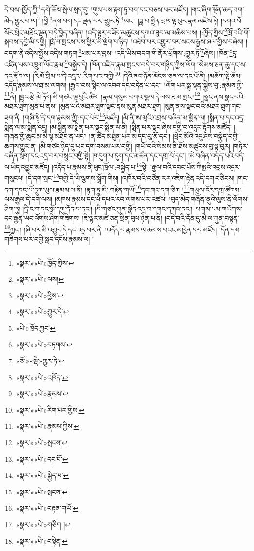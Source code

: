 དེ་བས་:ཁྱོད་ཀྱི་\footnote{«སྣར་»«པེ་»ཁྱོད་ཀྱིས་}དགེ་ཆོས་སྤེལ་སླད་དུ། །གུས་པས་རྟག་ཏུ་བག་དང་བཅས་པར་མཛོད། །གང་ཞིག་སྔོན་ཆད་བག་མེད་གྱུར་པ་ལ།\footnote{«སྣར་»«པེ་»ལས།} །ཕྱི་\footnote{«སྣར་»«པེ་»ཕྱིས་}ནས་བག་དང་ལྡན་པར་:གྱུར་ཏེ་\footnote{«སྣར་»«པེ་»གྱུར་དེ་}ཡང་། །ཟླ་བ་སྤྲིན་བྲལ་ལྟ་བུར་རྣམ་མཛེས་ཏེ། །དགའ་བོ་སོར་ཕྲེང་མཐོང་ལྡན་བདེ་བྱེད་བཞིན། །འདི་ལྟར་བཟོད་མཚུངས་དཀའ་ཐུབ་མ་མཆིས་པས། །:ཁྱོད་ཀྱིས་\footnote{«པེ་»ཁྲོད་ཀྱང་}ཁྲོ་བའི་གོ་སྐབས་དབྱེ་མི་བགྱི། །ཁྲོ་བ་སྤངས་པས་ཕྱིར་མི་ལྡོག་པ་ཉིད། །འཐོབ་པར་འགྱུར་བར་སངས་རྒྱས་ཞལ་གྱིས་བཞེས། །བདག་ནི་འདིས་སྤྱོས་འདིས་གཏག་\footnote{«སྣར་»«པེ་»བཏགས་}ཕམ་པར་བྱས། །འདི་ཡིས་བདག་གི་ནོར་ཕྲོགས་:གྱུར་ཏོ་\footnote{«ཅོ་»«སྡེ་»གྱུར་ཏེ་}ཞེས། །ཁོན་\footnote{«སྣར་»«པེ་»འཁོན་}དུ་འཛིན་པས་འཁྲུག་ལོང་རྣམ་\footnote{«སྣར་»«པེ་»རྣམས་}བསྐྱེད་དེ། །ཁོན་འཛིན་རྣམ་སྤངས་བདེ་བར་གཉིད་ཀྱིས་ལོག །སེམས་ཅན་ཆུ་དང་ས་དང་རྡོ་བ་ལ། །རི་མོ་བྲིས་པ་དེ་འདྲར་:རིག་པར་བགྱི།\footnote{«སྣར་»«པེ་»རིག་པར་གྱིས།} །དེའི་ནང་ཉོན་མོངས་ཅན་ལ་དང་པོ་ནི། །མཆོག་སྟེ་ཆོས་འདོད་རྣམས་ལ་ཐ་མ་ལགས། །རྒྱལ་བས་སྙིང་ལ་འབབ་དང་བདེན་པ་དང་། །ལོག་པར་སྨྲ་ལྡན་སྐྱེས་བུ་:རྣམས་ཀྱི་\footnote{«སྣར་»«པེ་»རྣམས་ཀྱིས་}ནི། །སྦྲང་རྩི་མེ་ཏོག་མི་གཙང་ལྟ་བུའི་ཚིག །རྣམ་གསུམ་བཀའ་སྩལ་དེ་ལས་ཐ་མ་སྤང་།\footnote{«སྣར་»«པེ་»སྤངས།} །སྣང་ནས་སྣང་བའི་མཐར་ཐུག་མུན་པ་ནས། །མུན་པའི་མཐར་ཐུག་སྣང་ནས་མུན་མཐར་ཐུག །མུན་ནས་སྣང་བའི་མཐར་ཐུག་གང་ཟག་ནི། །གཞི་སྟེ་དེ་དག་རྣམས་ཀྱི་:དང་པོར་\footnote{«སྣར་»«པེ་»དང་པོ་}མཛོད། །མི་ནི་ཨ་མྲའི་འབྲས་བཞིན་མ་སྨིན་ལ། །སྨིན་པ་དང་འདྲ་སྨིན་ལ་མ་སྨིན་འདྲ། །མ་སྨིན་མ་སྨིན་པར་སྣང་སྨིན་ལ་ནི། །སྨིན་པར་སྣང་ཞེས་བགྱི་བ་འདྲར་རྟོགས་མཛོད། །གཞན་གྱི་ཆུང་མ་མི་ལྟ་མཐོང་ན་ཡང་། །ན་ཚོད་མཐུན་པར་མ་དང་བུ་མོ་དང་། །སྲིང་མོའི་འདུ་ཤེས་བསྐྱེད་བགྱི་ཆགས་གྱུར་ན། །མི་གཙང་ཉིད་དུ་ཡང་དག་བསམ་པར་བགྱི། །གཡོ་བའི་སེམས་ནི་ཐོས་མཚུངས་བུ་ལྟ་བུར། །གཏེར་བཞིན་སྲོག་དང་འདྲ་བར་བསྲུང་བགྱི་སྟེ། །གདུག་པ་དུག་དང་མཚོན་དང་དགྲ་བོ་དང་། །མེ་བཞིན་འདོད་པའི་བདེ་ལ་ཡིད་འབྱུང་མཛོད། །འདོད་པ་རྣམས་ནི་ཕུང་ཁྲོལ་:བསྐྱེད་པ་\footnote{«སྣར་»«པེ་»སྐྱེད་པ་}སྟེ། །རྒྱལ་བའི་དབང་པོས་ཀིམྤའི་འབྲས་འདྲར་གསུངས། །དེ་དག་སྤང་\footnote{«སྣར་»«པེ་»སྤངས་}བགྱི་དེ་ཡི་ལྕགས་སྒྲོག་གིས། །འཁོར་བའི་བཙོན་རར་འཇིག་རྟེན་འདི་དག་བཅིངས། །གང་དག་དབང་པོ་དྲུག་ཡུལ་རྣམས་ལ་ནི། །རྟག་ཏུ་མི་:བརྟེན་གཡོ་\footnote{«སྣར་»«པེ་»བརྟན་གཡོ་}དང་གང་དག་ཅིག །\footnote{«སྣར་»«པེ་»གཅིག །}གཡུལ་ངོར་དགྲ་ཚོགས་ལས་རྒྱལ་དེ་དག་ལས། །མཁས་རྣམས་དང་པོ་དཔའ་རབ་ལགས་པར་འཚལ། །བུད་མེད་གཞོན་ནུའི་ལུས་ནི་ལོགས་ཤིག་ཏུ། །དྲི་ང་བ་དང་སྒོ་དགུ་དོད་པ་དང་། །མི་གཙང་ཀུན་སྣོད་འདྲ་བ་དགང་དཀའ་དང་། །པགས་པས་གཡོགས་དང་རྒྱན་ཡང་ལོགས་ཤིག་གཟིགས། །ཇི་ལྟར་མཛེ་ཅན་སྲིན་བུས་ཉེན་པ་ནི། །བདེ་བའི་དོན་དུ་མེ་ལ་ཀུན་བསྟན་\footnote{«སྣར་»«པེ་»བསྟེན་}ཀྱང་། །ཞི་བར་མི་འགྱུར་དེ་དང་འདྲ་བར་ནི། །འདོད་པ་རྣམས་ལ་ཆགས་པའང་མཁྱེན་པར་མཛོད། །དོན་དམ་གཟིགས་པར་བགྱི་སླད་དངོས་རྣམས་ལ། །
